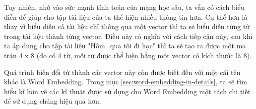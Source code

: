 Tuy nhiên, nhờ vào sức mạnh tính toán của mạng học sâu, ta vẫn có cách biểu điễn để giúp cho tập tài liệu của ta thể hiện nhiều thông tin hơn. Cụ thể hơn là thay vì biểu diễn cả tài liệu chỉ thông qua một vector thì ta sẽ biểu diễn từng từ trong tài liệu thành từng vector. Điều này có nghĩa với cách tiếp cận này, sau khi ta áp dung cho tập tài liệu "Hôm\_qua tôi đi học" thì ta sẽ tạo ra được một ma trận 4 x 8 (do có 4 từ, mỗi từ được thể hiện bằng một vector có kích thước là 8).

Quá trình biến đổi từ thành các vector này còn được biết đến với một cái tên khác là Word Embedding. Trong mục \ref{sec:word-embedding-in-details}, ta sẽ tìm hiểu kĩ hơn về các kĩ thuật được sử dụng cho Word Embedding một cách chi tiết để sử dụng chúng hiệu quả hơn.